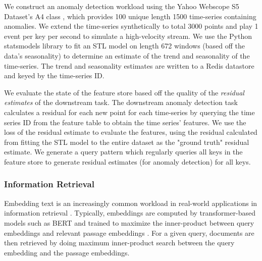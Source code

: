 We construct an anomaly detection workload using the Yahoo Webscope S5 Dataset's A4 class \cite{laptev2015yahoo}, which provides 100 unique length 1500 time-series containing anomalies. We extend the time-series synthetically to total 3000 points and play 1 event per key per second to simulate a high-velocity stream. We use the Python statsmodels library \cite{seabold2010statsmodels} to fit an STL model on length 672 windows (based off the data's seasonality) to determine an estimate of the trend and seasonality of the time-series. The trend and seasonality estimates are written to a Redis datastore and keyed by the time-series ID. 


We evaluate the state of the feature store based off the quality of the \textit{residual estimates} of the downstream task. The downstream anomaly detection task calculates a residual for each new point for each time-series by querying the time series ID from the feature table to obtain the time series' features. We use the loss of the residual estimate to evaluate the features, using the residual calculated from fitting the STL model to the entire dataset as the "ground truth" residual estimate. We generate a query pattern which regularly queries all keys in the feature store to generate residual estimates (for anomaly detection) for all keys. 
 
\subsubsection{Information Retrieval} 

Embedding text is an increasingly common workload in real-world applications in information retrieval \cite{xiong2020approximate,huang2020embedding}. Typically, embeddings are computed by transformer-based models such as BERT \cite{devlin2019bert} and trained to maximize the inner-product between query embeddings and relevant passage embeddings \cite{karpukhindense}. For a given query, documents are then retrieved by doing maximum inner-product search between the query embedding and the passage embeddings.

